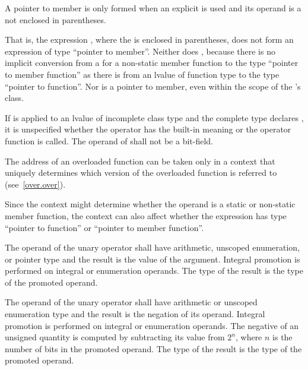 \pnum
A pointer to member is only formed when an explicit \tcode{\&} is used
and its operand is a  not enclosed in
parentheses.
\begin{note}
That is, the expression , where the
 is enclosed in parentheses, does not form an
expression of type ``pointer to member''. Neither does
, because there is no implicit conversion from a
 for a non-static member function to the type
``pointer to member function'' as there is from an lvalue of function
type to the type ``pointer to function''. Nor is
 a pointer to member, even within the scope of
the 's class.
\end{note}

\pnum
If \tcode{\&} is applied to an lvalue of incomplete class type and the
complete type declares , it is unspecified whether
the operator has the built-in meaning or the operator function is
called. The operand of \tcode{\&} shall not be a bit-field.

\pnum
{}%
The address of an overloaded function can be taken
only in a context that uniquely determines which version of the
overloaded function is referred to (see~\ref{over.over}).
\begin{note}
Since the context might determine whether the operand is a static or
non-static member function, the context can also affect whether the
expression has type ``pointer to function'' or ``pointer to member
function''.
\end{note}

\pnum
{}%
The operand of the unary \tcode{+} operator shall have arithmetic, unscoped
enumeration, or pointer type and the result is the value of the
argument. Integral promotion is performed on integral or enumeration
operands. The type of the result is the type of the promoted operand.

\pnum
{}%
The operand of the unary \tcode{-} operator shall have arithmetic or unscoped
enumeration type and the result is the negation of its operand. Integral
promotion is performed on integral or enumeration operands. The negative
of an unsigned quantity is computed by subtracting its value from $2^n$,
where $n$ is the number of bits in the promoted operand. The type of the
result is the type of the promoted operand.

